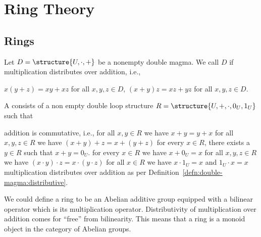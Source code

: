 
\chapter{Ring Theory}

\section{Rings}

\begin{definition}\label{defn:double-magma:distributive}
Let $D=\structure{U,\cdot,+}$ be a nonempty double magma. We call $D$
 if multiplication distributes over addition,
i.e.,
\begin{itemize}
 $x(y+z)=xy+xz$ for all $x,y,z\in D$,
 $(x+y)z=xz+yz$ for all $x,y,z\in D$.
\end{itemize}
\end{definition}

\begin{definition}
A  consists of a non empty double loop structure
$R=\structure{U,+,\cdot,0_{U},1_{U}}$ such that
\begin{itemize}
 addition is commutative, i.e., for all $x,y\in R$
  we have $x + y = y + x$
 for all $x,y,z\in R$ we have
  $(x+y)+z=x+(y+z)$
 for every $x\in R$, there exists a
  $y\in R$ such that $x + y = 0_{U}$.
 for every $x\in R$ we have $x + 0_{U} = x$
 for all $x,y,z\in R$
  we have $(x\cdot y)\cdot z=x\cdot(y\cdot z)$
 for all $x\in R$ we have $x\cdot 1_{U}=x$ and
  $1_{U}\cdot x = x$
 multiplication distributes over addition as
  per Definition~\ref{defn:double-magma:distributive}.
\end{itemize}
\end{definition}

\begin{remark}[Ring = Abelian additive group + multiplication]
We could define a ring to be an Abelian additive group equipped with a
bilinear operator which is its multiplication operator. Distributivity
of multiplication over addition comes for ``free'' from
bilinearity. This means that a ring is a monoid object in the category
of Abelian groups.
\end{remark}

